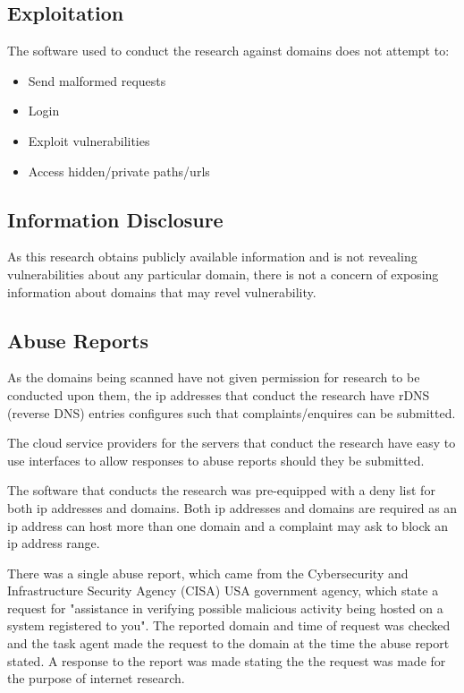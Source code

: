 \documentclass{mscreport}
\begin{document}
\subsection{Exploitation}

The software used to conduct the research against domains does not attempt to:

\begin{itemize}
	\setlength\itemsep{0.1em}
    \item Send malformed requests
    \item Login
    \item Exploit vulnerabilities
    \item Access hidden/private paths/urls
\end{itemize}

\subsection{Information Disclosure}

As this research obtains publicly available information and is not revealing vulnerabilities about any particular domain, there is not a concern of exposing information about domains that may revel vulnerability.

\subsection{Abuse Reports}

As the domains being scanned have not given permission for research to be conducted upon them, the ip addresses that conduct the research have rDNS (reverse DNS) entries configures such that complaints/enquires can be submitted.

\vspace{0.3cm} \noindent
The cloud service providers for the servers that conduct the research have easy to use interfaces to allow responses to abuse reports should they be submitted.

\vspace{0.3cm} \noindent
The software that conducts the research was pre-equipped with a deny list for both ip addresses and domains. Both ip addresses and domains are required as an ip address can host more than one domain and a complaint may ask to block an ip address range.

\vspace{0.3cm} \noindent
There was a single abuse report, which came from the Cybersecurity and Infrastructure Security Agency (CISA) \cite{noauthor_undated-fh} USA government agency, which state a request for "assistance in verifying possible malicious activity being hosted on a system registered to you". The reported domain and time of request was checked and the task agent made the request to the domain at the time the abuse report stated. A response to the report was made stating the the request was made for the purpose of internet research.
\end{document}
